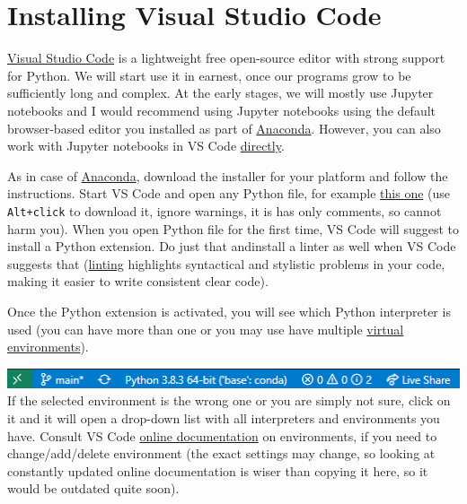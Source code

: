 \documentclass[
]{book}
\begin{document}
\hypertarget{install-vs-code}{%
\section*{Installing Visual Studio Code}\label{install-vs-code}}

\href{https://code.visualstudio.com/}{Visual Studio Code} is a lightweight free open-source editor with strong support for Python. We will start use it in earnest, once our programs grow to be sufficiently long and complex. At the early stages, we will mostly use Jupyter notebooks and I would recommend using Jupyter notebooks using the default browser-based editor you installed as part of \protect\hyperlink{install-anaconda}{Anaconda}. However, you can also work with Jupyter notebooks in VS Code \href{https://code.visualstudio.com/docs/python/jupyter-support}{directly}.

As in case of \protect\hyperlink{install-anaconda}{Anaconda}, download the installer for your platform and follow the instructions. Start VS Code and open any Python file, for example \href{other/empty.py}{this one} (use \texttt{Alt+click} to download it, ignore warnings, it is has only comments, so cannot harm you). When you open Python file for the first time, VS Code will suggest to install a Python extension. Do just that andinstall a linter as well when VS Code suggests that (\href{https://code.visualstudio.com/docs/python/linting}{linting} highlights syntactical and stylistic problems in your code, making it easier to write consistent clear code).

Once the Python extension is activated, you will see which Python interpreter is used (you can have more than one or you may use have multiple \href{https://docs.python.org/3/tutorial/venv.html}{virtual environments}).

\includegraphics[width=6.96in]{images/vscode-python-interpreter}
If the selected environment is the wrong one or you are simply not sure, click on it and it will open a drop-down list with all interpreters and environments you have. Consult VS Code \href{https://code.visualstudio.com/docs/python/environments}{online documentation} on environments, if you need to change/add/delete environment (the exact settings may change, so looking at constantly updated online documentation is wiser than copying it here, so it would be outdated quite soon).
\end{document}

